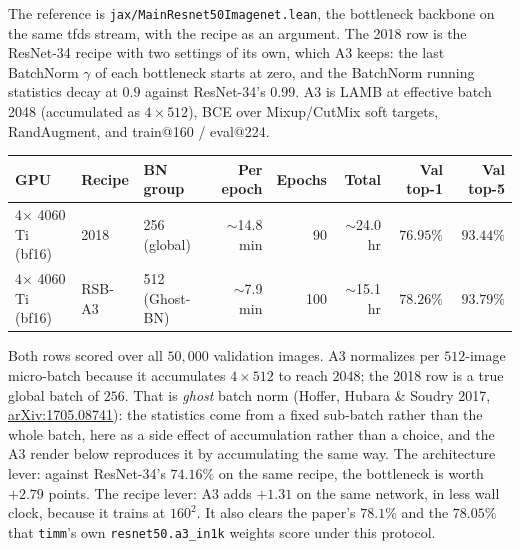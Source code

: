 
The reference is \texttt{jax/MainResnet50Imagenet.lean}, the bottleneck
backbone on the same tfds stream, with the recipe as an argument. The 2018
row is the ResNet-34 recipe with two settings of its own, which A3 keeps:
the last BatchNorm $\gamma$ of each bottleneck starts at zero, and the
BatchNorm running statistics decay at $0.9$ against ResNet-34's $0.99$.
A3 is LAMB at effective batch
2048 (accumulated as $4\times512$), BCE over Mixup/CutMix soft targets,
RandAugment, and train@160 / eval@224.

\begin{center}
\begin{tabular}{l l l r r r r r}
\hline
GPU & Recipe & BN group & Per epoch & Epochs & Total & Val top-1 & Val top-5 \\
\hline
4$\times$ 4060 Ti (bf16) & 2018   & 256 (global)   & $\sim$14.8 min & 90  & $\sim$24.0 hr & $\mathbf{76.95\%}$ & $\mathbf{93.44\%}$ \\
4$\times$ 4060 Ti (bf16) & RSB-A3 & 512 (Ghost-BN) & $\sim$7.9 min  & 100 & $\sim$15.1 hr & $\mathbf{78.26\%}$ & $\mathbf{93.79\%}$ \\
\hline
\end{tabular}
\end{center}

\noindent Both rows scored over all $50{,}000$ validation images. A3
normalizes per $512$-image micro-batch because it accumulates
$4 \times 512$ to reach $2048$; the 2018 row is a true global batch of
$256$. That is \emph{ghost} batch norm (Hoffer, Hubara \& Soudry 2017,
\href{https://arxiv.org/abs/1705.08741}{arXiv:1705.08741}): the
statistics come from a fixed sub-batch rather than the whole batch, here
as a side effect of accumulation rather than a choice, and the A3 render
below reproduces it by accumulating the same way. The
architecture lever: against ResNet-34's $74.16\%$ on the same
recipe, the bottleneck is worth $+2.79$ points. The recipe lever: A3 adds
$+1.31$ on the same network, in less wall clock, because it trains at
$160^2$. It also clears the paper's $78.1\%$ and the $78.05\%$ that
\texttt{timm}'s own \texttt{resnet50.a3\_in1k} weights score under this
protocol.

